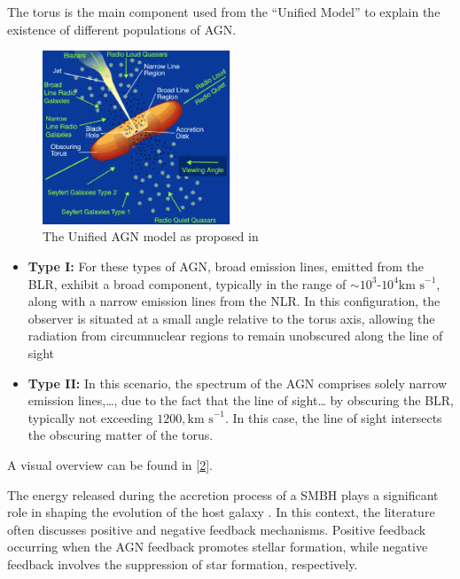 The torus is the main component used from the “Unified Model” \cite{1995PASP..107..803U} to explain the existence of different populations of AGN. 
 
\begin{figure}[hbtb]
  \centering
  \includegraphics[width=0.5\textwidth]{UnifiedAGNmodel}
  \caption{The Unified AGN model as proposed in \cite{1995PASP..107..803U}}
  \label{2}
\end{figure}


\begin{itemize}
  \item \textbf{Type I:} For these types of AGN, broad emission lines, emitted from the BLR, exhibit a broad component, typically in the range of $\sim 10^{3}$-$10^{4} \text{km s}^{-1}$, along with a narrow emission lines from the NLR. In this configuration, the observer is situated at a small angle relative to the torus axis, allowing the radiation from circumnuclear regions to remain unobscured along the line of sight
  
  \item \textbf{Type II:} In this scenario, the spectrum of the AGN comprises solely narrow emission lines,…, due to the fact that the line of sight… by obscuring the BLR, typically not exceeding $1200 , \text{km s}^{-1}$. In this case, the line of sight intersects the obscuring matter of the torus.
  
\end{itemize}
A visual overview can be found in \autoref{2}.


The energy released during the accretion process of a SMBH plays a significant role in shaping the evolution of the host galaxy \cite{2021A&A...646A.167M}. In this context, the literature often discusses positive and negative feedback mechanisms.
Positive feedback occurring when the AGN feedback promotes stellar formation, while negative feedback involves the suppression of star formation, respectively.


